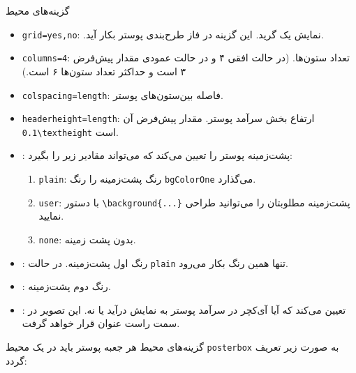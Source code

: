 \documentclass[debug,a0paper,persian]{xebaposter}
\begin{document}
\begin{poster}
\begin{posterbox}[name=posteroption,column=1,span=2,below=classoption]{گزینه‌های محیط }
\begin{itemize}
    \item \texttt{grid={yes,no}}: .نمایش یک گرید. این گزینه در فاز طرح‌بندی پوستر بکار آید.
    \item \texttt{columns=4}:  تعداد ستون‌ها. 
     (در حالت افقی ۴ و در حالت عمودی مقدار پیش‌فرض ۳ است و حداکثر تعداد ستون‌ها ۶ است.)
    \item \texttt{colspacing=length}: فاصله بین‌ستون‌های پوستر.
    \item \texttt{headerheight=length}: ارتفاع بخش سرآمد پوستر. مقدار پیش‌فرض آن {\verb|0.1\textheight|} است.
    \item {}: پشت‌زمینه پوستر را تعیین می‌کند که می‌تواند مقادیر زیر را بگیرد:
    \begin{enumerate}
        \item \texttt{plain}: رنگ پشت‌زمینه را رنگ \texttt{bgColorOne} می‌گذارد.
        \item \texttt{user}: با دستور \verb|\background{...}| پشت‌زمینه مطلوبتان را می‌توانید طراحی نمایید.
        \item \texttt{none}: بدون پشت زمینه.
    \end{enumerate}
    \item {}: رنگ اول پشت‌زمینه. در حالت \texttt{plain} تنها همین رنگ بکار می‌رود.
    \item {}: رنگ دوم پشت‌زمینه.
    \item {}: تعیین می‌کند که آیا آی‌کچر در سرآمد پوستر به نمایش درآید یا نه. 
    این تصویر در سمت راست عنوان قرار خواهد گرفت.
\end{itemize}
\end{posterbox}
\begin{posterbox}[name=posterboxoption,column=1,span=2,below=posteroption,textborder=none
,headershape=rectangle,headerborder=none,textborder=coils]
{گزینه‌های محیط }
    هر جعبه پوستر باید در یک محیط \texttt{posterbox} به صورت زیر تعریف گردد:

\end{posterbox}
\end{poster}
\end{document}
